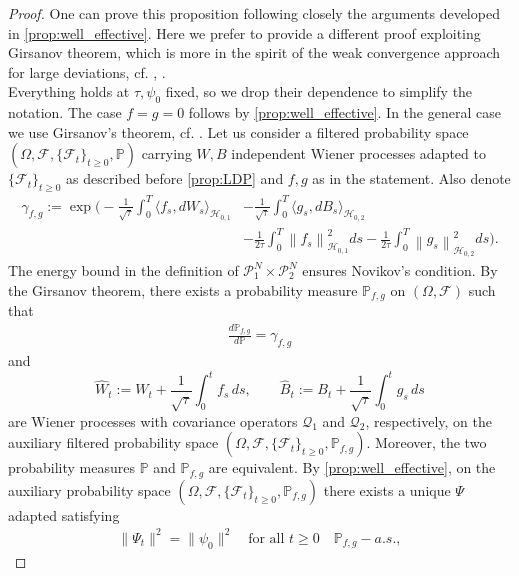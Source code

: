\documentclass[a4paper,10pt]{amsart}
\newcommand{\norm}[1]{\left\|#1\right\|}
\theoremstyle{remark}
\numberwithin{equation}{section}
\begin{document}
\begin{proof}
One can prove this proposition following closely the arguments developed in \cref{prop:well_effective}. Here we prefer to provide a different proof exploiting Girsanov theorem, which is more in the spirit of the weak convergence approach for large deviations, cf. \cite[Theorem 10]{LDPweak_convergence}, \cite[Proposition 24]{fehrman2023non}.\\
Everything holds at $\tau,\psi_0$ fixed, so we drop their dependence to simplify the notation.
The case $f=g=0$ follows by \cref{prop:well_effective}. In the general
case we use Girsanov's theorem, cf. \cite[Chapter 10]{da2014stochastic}.
Let us consider a filtered probability space $(\Omega,\mathcal{F},\{\mathcal{F}_t\}_{t\geq 0},\mathbb{P})$ carrying $W, B$ independent Wiener processes adapted to $\{\mathcal{F}_t\}_{t \geq 0}$ as described before \cref{prop:LDP} and $f,g$ as in the statement. Also denote \begin{align*}
    \gamma_{f,g}:=\exp\Bigg(-\frac{1}{\sqrt{\tau}}\int_0^T \langle f_s,dW_s\rangle_{\mathcal{H}_{0,1}}&-\frac{1}{\sqrt{\tau}}\int_0^T \langle g_s,dB_s\rangle_{\mathcal{H}_{0,2}}\\ & -\frac{1}{2\tau}\int_0^T \norm{f_s}_{\mathcal{H}_{0,1}}^2 ds-\frac{1}{2\tau}\int_0^T \norm{g_s}_{\mathcal{H}_{0,2}}^2 ds\Bigg).
\end{align*}
The energy bound in the definition of $\mathcal P_1^N\times\mathcal
P_2^N$ ensures Novikov's condition.
By the Girsanov theorem, there exists a probability measure $\mathbb{P}_{f,g}$ on $(\Omega,\mathcal{F})$ such that 
\begin{align*}
    \frac{d \mathbb{P}_{f,g}}{d\mathbb{P}}=\gamma_{f,g}
\end{align*}
and
\begin{equation*}
     \hat{W}_t:=W_t+\frac{1}{\sqrt{\tau}}\int_0^t f_s\,ds,
 \qquad
 \hat{B}_t:=B_t+\frac{1}{\sqrt{\tau}}\int_0^t g_s\,ds
\end{equation*}
are Wiener processes with covariance operators $\mathcal{Q}_1$ and
$\mathcal{Q}_2$, respectively, on the auxiliary filtered probability
space $(\Omega,\mathcal{F},\{\mathcal{F}_t\}_{t\geq 0},\mathbb{P}_{f,g})$.
Moreover, the two probability measures $\mathbb{P}$ and $\mathbb{P}_{f,g}$ are equivalent. By \cref{prop:well_effective}, on the auxiliary probability space $(\Omega,\mathcal{F},\{\mathcal{F}_t\}_{t\geq 0},\mathbb{P}_{f,g})$ there exists a unique $\Psi$ adapted satisfying \begin{align*}
        \|\Psi_t\|^2=\|\psi_0\|^2 \quad \text{for all }t\geq 0\quad  \mathbb{P}_{f,g}-a.s.,

\end{align*}
\end{proof}
\end{document}
